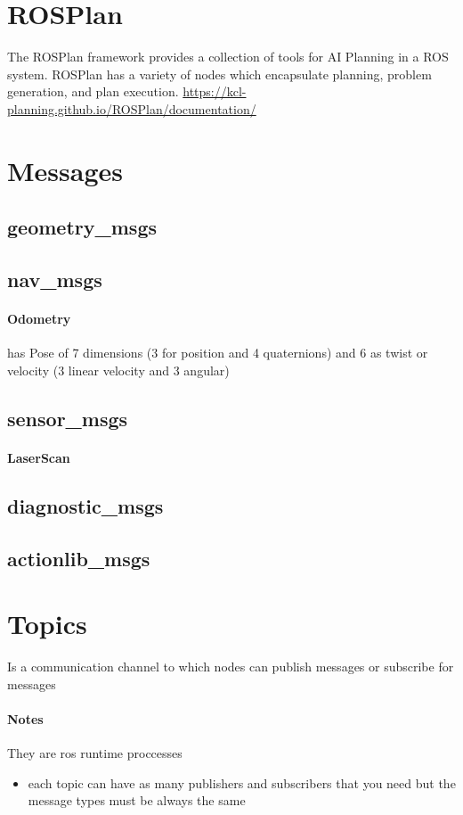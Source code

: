 \section{ROSPlan}
    The ROSPlan framework provides a collection of tools for AI Planning in a ROS system. ROSPlan has a variety of nodes which encapsulate planning, problem generation, and plan execution.
    \url{https://kcl-planning.github.io/ROSPlan/documentation/}
\section{Messages}
    \subsection{geometry\_msgs}
    \subsection{nav\_msgs}
        \paragraph{Odometry}
            has Pose of 7 dimensions (3 for position and 4 quaternions) and 6 as twist or velocity (3 linear velocity and 3 angular)
    \subsection{sensor\_msgs}
        \paragraph{LaserScan}
    \subsection{diagnostic\_msgs}
    \subsection{actionlib\_msgs}
\section{Topics}
    Is a communication channel to which nodes can publish messages or subscribe for messages

    \paragraph{Notes}
        They are ros runtime proccesses
        \begin{itemize}
            \item each topic can have as many publishers and subscribers that you need but the message types must be always the same
        \end{itemize}
